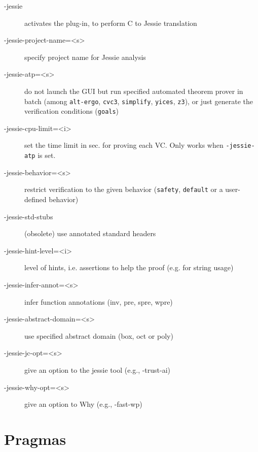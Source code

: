 \documentclass[a4paper,11pt,twoside,openright]{report}
\begin{document}
\begin{description}
\item[-jessie]
  activates the plug-in, to perform C to Jessie translation

\item[-jessie-project-name=<s>]
  specify project name for Jessie analysis

\item[-jessie-atp=<s>] do not launch the GUI but run specified
  automated theorem prover in batch (among \verb|alt-ergo|,
  \verb|cvc3|, \verb|simplify|, \verb|yices|, \verb|z3|), or just
  generate the verification conditions (\verb|goals|)

\item[-jessie-cpu-limit=<i>] set the time limit in sec. for proving
  each VC. Only works when \verb|-jessie-atp| is set.

\item[-jessie-behavior=<s>] restrict verification to the given
  behavior (\texttt{safety}, \texttt{default} or a user-defined
  behavior)

\item[-jessie-std-stubs]
  (obsolete) use annotated standard headers

\item[-jessie-hint-level=<i>]
  level of hints, i.e. assertions to help the
  proof (e.g. for string usage)

\item[-jessie-infer-annot=<s>]
  infer function annotations (inv, pre, spre, wpre)

\item[-jessie-abstract-domain=<s>]
  use specified abstract domain (box, oct or poly)

\item[-jessie-jc-opt=<s>] give an option to
  the jessie tool (e.g., -trust-ai)

\item[-jessie-why-opt=<s>]
  give an option to Why (e.g., -fast-wp)
\end{description}

\section{Pragmas}
\end{document}
